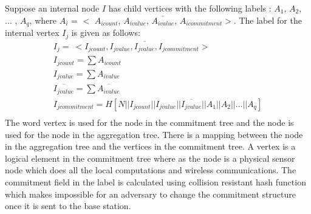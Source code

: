 	Suppose an internal node $I$ has child vertices with the following labels : $A_{1}$, $A_{2}$, $\dotsc$ , $A_{q}$, where $A_{i}$ = $<$ $A_{icount}$, $A_{ivalue}$, $\overline{A_{ivalue}}$, $A_{icommitment}$$>$. 
	The label for the internal vertex $I_{j}$ is given as follows:
	\begin{equation}
		\begin{array}{l}
			I_{j} =\ <I_{jcount}, I_{jvalue}, \overline{I_{jvalue}}, I_{jcommitment}>\\
			I_{jcount} = \sum A_{icount}\\ 
			I_{jvalue} = \sum A_{ivalue}\\
			\overline{I_{jvalue}} = \sum \overline{A_{ivalue}}\\
			I_{jcommitment} = H[N||I_{jcount}||I_{jvalue}||\overline{I_{jvalue}}||A_{1}||A_{2}|| \dotsc ||A_{q}]\\
		\end{array}
	\end{equation}
	The word vertex is used for the node in the commitment tree and the node is used for the node in the aggregation tree.
	There is a mapping between the node in the aggregation tree and the vertices in the commitment tree.
	A vertex is a logical element in the commitment tree where as the node is a physical sensor node which does all the local computations and wireless communications.
	The commitment field in the label is calculated using collision resistant hash function which makes impossible for an adversary to change the commitment structure once it is sent to the base station.

